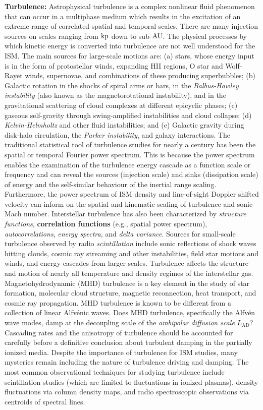 \documentclass[a4paper,10pt]{article}
\begin{document}
{\noindent}\textbf{Turbulence:} Astrophysical turbulence is a complex nonlinear fluid phenomenon that can occur in a multiphase medium which results in the excitation of an extreme range of correlated spatial and temporal scales. There are many injection sources on scales ranging from ${\rm kp}$ down to sub-${\rm AU}$. The physical processes by which kinetic energy is converted into turbulence are not well understood for the ISM. The main sources for large-scale motions are: (a) stars, whose energy input is in the form of protostellar winds, expanding HII regions, O star and Wolf-Rayet winds, supernovae, and combinations of these producing superbubbles; (b) Galactic rotation in the shocks of spiral arms or bars, in the \textit{Balbus-Hawley instability} (also known as the magnetorotational instability), and in the gravitational scattering of cloud complexes at different epicyclic phases; (c) gaseous self-gravity through swing-amplified instabilities and cloud collapse; (d) \textit{Kelvin-Helmholtz} and other fluid instabilities; and (e) Galactic gravity during disk-halo circulation, the \textit{Parker instability}, and galaxy interactions. The traditional statistical tool of turbulence studies for nearly a century has been the spatial or temporal Fourier power spectrum. This is because the power spectrum enables the examination of the turbulence energy cascade as a function scale or frequency and can reveal the sources (injection scale) and sinks (dissipation scale) of energy and the self-similar behaviour of the inertial range scaling. Furthermore, the power spectrum of ISM density and line-of-sight Doppler shifted velocity can inform on the spatial and kinematic scaling of turbulence and sonic Mach number. Interstellar turbulence has also been characterized by \textit{structure functions}, \textbf{correlation functions} (e.g., spatial power spectrum), \textit{autocorrelations}, \textit{energy spectra}, and \textit{delta variance}. Sources for small-scale turbulence observed by radio \textit{scintillation} include sonic reflections of shock waves hitting clouds, cosmic ray streaming and other instabilities, field star motions and winds, and energy cascades from larger scales. Turbulence affects the structure and motion of nearly all temperature and density regimes of the interstellar gas. Magnetohydrodynamic (MHD) turbulence is a key element in the study of star formation, molecular cloud structure, magnetic reconnection, heat transport, and cosmic ray propagation. MHD turbulence is known to be different from a collection of linear Alfv\'enic waves. Does MHD turbulence, specifically the Alfv\'en wave modes, damp at the decoupling scale of the \textit{ambipolar diffusion scale} $L_\mathrm{AD}$? Cascading rates and the anisotropy of turbulence should be accounted for carefully before a definitive conclusion about turbulent damping in the partially ionized media. Despite the importance of turbulence for ISM studies, many mysteries remain including the nature of turbulence driving and damping. The most common observational techniques for studying turbulence include scintillation studies (which are limited to fluctuations in ionized plasmas), density fluctuations via column density maps, and radio spectroscopic observations via centroids of spectral lines. 
\end{document}
